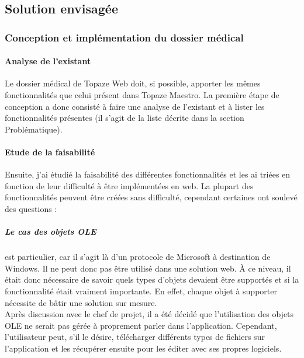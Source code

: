 \subsection{Solution envisagée}
\subsubsection{Conception et implémentation du dossier médical}

\paragraph{Analyse de l'existant\\}
Le dossier médical de Topaze Web doit, si possible, apporter les mêmes fonctionnalités que celui présent dans Topaze Maestro.
La première étape de conception a donc consisté à faire une analyse de l’existant et à lister les fonctionnalités présentes (il s’agit de la liste décrite dans la section Problématique).

\paragraph{Etude de la faisabilité\\}
Ensuite, j'ai étudié la faisabilité des différentes fonctionnalités et les ai triées en fonction de leur difficulté à être implémentées en web. La plupart des fonctionnalités peuvent être créées sans difficulté, cependant certaines ont soulevé des questions :

\subparagraph*{Le cas des objets OLE} est particulier, car il s'agit là d'un protocole de Microsoft à destination de Windows. 
Il ne peut donc pas être utilisé dans une solution web. À ce niveau, il était donc nécessaire de savoir quels types d'objets devaient être supportés et si la fonctionnalité était vraiment importante. En effet, chaque objet à supporter nécessite de bâtir une solution sur mesure.\\
Après discussion avec le chef de projet, il a été décidé que l'utilisation des objets OLE ne serait pas gérée à proprement parler dans l'application. Cependant, l'utilisateur peut, s'il le désire, télécharger différents types de fichiers sur l'application et les récupérer ensuite pour les éditer avec ses propres logiciels.

